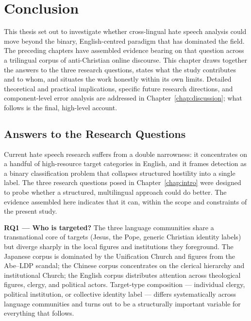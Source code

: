 \documentclass[../CLthesis.tex]{subfiles}
\begin{document}
\chapter{Conclusion}%
\label{chap:conclusion}

This thesis set out to investigate whether cross-lingual hate speech analysis could move beyond the binary, English-centred paradigm that has dominated the field. The preceding chapters have assembled evidence bearing on that question across a trilingual corpus of anti-Christian online discourse. This chapter draws together the answers to the three research questions, states what the study contributes and to whom, and situates the work honestly within its own limits. Detailed theoretical and practical implications, specific future research directions, and component-level error analysis are addressed in Chapter~\ref{chap:discussion}; what follows is the final, high-level account.

\section{Answers to the Research Questions}
\label{sec:conclusion-rq}

Current hate speech research suffers from a double narrowness: it concentrates on a handful of high-resource target categories in English, and it frames detection as a binary classification problem that collapses structured hostility into a single label. The three research questions posed in Chapter~\ref{chap:intro} were designed to probe whether a structured, multilingual approach could do better. The evidence assembled here indicates that it can, within the scope and constraints of the present study.

\textbf{RQ1 --- Who is targeted?} The three language communities share a transnational core of targets (Jesus, the Pope, generic Christian identity labels) but diverge sharply in the local figures and institutions they foreground. The Japanese corpus is dominated by the Unification Church and figures from the Abe--LDP scandal; the Chinese corpus concentrates on the clerical hierarchy and institutional Church; the English corpus distributes attention across theological figures, clergy, and political actors. Target-type composition --- individual clergy, political institution, or collective identity label --- differs systematically across language communities and turns out to be a structurally important variable for everything that follows.
\end{document}
